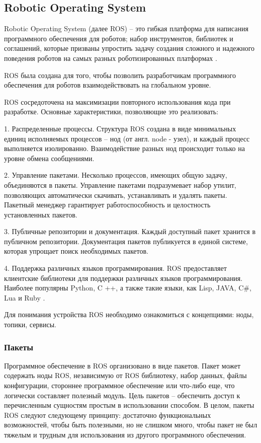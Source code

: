 
\subsection{Robotic Operating System}

Robotic Operating System (далее ROS) -- это гибкая платформа для написания программного обеспечения для роботов; набор инструментов, библиотек и соглашений, которые призваны упростить задачу создания сложного и надежного поведения роботов на самых разных роботизированных платформах \cite{ros}.

ROS была создана для того, чтобы позволить разработчикам программного обеспечения для роботов взаимодействовать на глобальном уровне.

ROS сосредоточена на максимизации повторного использования кода при разработке. Основные характеристики, позволяющие это реализовать:

1. Распределенные процессы. Структура ROS создана в виде минимальных единиц исполняемых процессов -- нод (от англ. node - узел), и каждый процесс выполняется изолированно. Взаимодействие разных нод происходит только на уровне обмена сообщениями.

2. Управление пакетами. Несколько процессов, имеющих общую задачу, объединяются в пакеты. Управление пакетами подразумевает набор утилит, позволяющих автоматически скачивать, устанавливать и удалять пакеты. Пакетный менеджер гарантирует работоспособность и целостность установленных пакетов.

3. Публичные репозитории и документация. Каждый доступный пакет хранится в публичном репозитории. Документация пакетов публикуется в единой системе, которая упрощает поиск необходимых пакетов.

4. Поддержка различных языков программирования. ROS предоставляет клиентские библиотеки для поддержки различных языков программирования. Наиболее популярны Python, C ++, а также такие языки, как Lisp, JAVA, C\#, Lua и Ruby \cite{voltbro}.

Для понимания устройства ROS необходимо ознакомиться с концепциями: ноды, топики, сервисы.

\subsubsection{Пакеты}
Программное обеспечение в ROS организовано в виде пакетов. Пакет может содержать ноды ROS, независимую от ROS библиотеку, набор данных, файлы конфигурации, стороннее программное обеспечение или что-либо еще, что логически составляет полезный модуль. Цель пакетов -- обеспечить доступ к перечисленным сущностям простым в использовании способом. В целом, пакеты ROS следуют следующему принципу: достаточно функциональных возможностей, чтобы быть полезными, но не слишком много, чтобы пакет не был тяжелым и трудным для использования из другого программного обеспечения.


